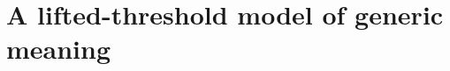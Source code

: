 \documentclass[10pt,letterpaper]{article}
\newcommand{\red}[1]{\textcolor{Red}{#1}}
\begin{document}
%







\section{A lifted-threshold model of generic meaning}
\label{sec:model}
\end{document}
